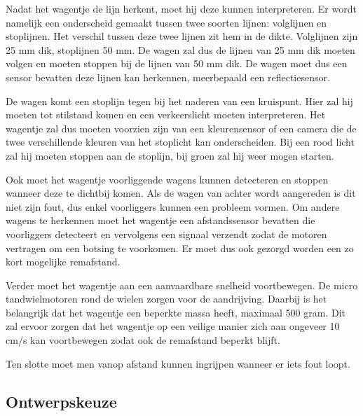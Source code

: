 \documentclass[a4paper,twoside,kulak]{kulakreport} %
\begin{document}
Nadat het wagentje de lijn herkent, moet hij deze kunnen interpreteren. Er wordt namelijk een onderscheid gemaakt tussen twee soorten lijnen: volglijnen en stoplijnen. Het verschil tussen deze twee lijnen zit hem in de dikte. Volglijnen zijn 25 mm dik, stoplijnen 50 mm. De wagen zal dus de lijnen van 25 mm dik moeten volgen en moeten stoppen bij de lijnen van 50 mm dik. De wagen moet dus een sensor bevatten deze lijnen kan herkennen, meerbepaald een reflectiesensor.

De wagen komt een stoplijn tegen bij het naderen van een kruispunt. Hier zal hij moeten tot stilstand komen en een verkeerslicht moeten interpreteren. Het wagentje zal dus moeten voorzien zijn van een kleurensensor of een camera die de twee verschillende kleuren van het stoplicht kan onderscheiden. Bij een rood licht zal hij moeten stoppen aan de stoplijn, bij groen zal hij weer mogen starten.

Ook moet het wagentje voorliggende wagens kunnen detecteren en stoppen wanneer deze te dichtbij komen. Als de wagen van achter wordt aangereden is dit niet zijn fout, dus enkel voorliggers kunnen een probleem vormen. Om andere wagens te herkennen moet het wagentje een afstandssensor bevatten die voorliggers detecteert en vervolgens een signaal verzendt zodat de motoren vertragen om een botsing te voorkomen. Er moet dus ook gezorgd worden een zo kort mogelijke remafstand.

Verder moet het wagentje aan een aanvaardbare snelheid voortbewegen. De micro tandwielmotoren rond de wielen zorgen voor de aandrijving. Daarbij is het belangrijk dat het wagentje een beperkte massa heeft, maximaal 500 gram. Dit zal ervoor zorgen dat het wagentje op een veilige manier zich aan ongeveer 10 cm/s kan voortbewegen zodat ook de remafstand beperkt blijft.

Ten slotte moet men vanop afstand kunnen ingrijpen wanneer er iets fout loopt.





\subsection{Ontwerpskeuze} %
\end{document}
